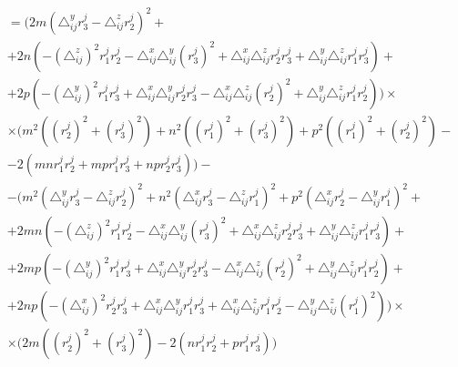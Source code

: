 $$\begin{gathered}
	 = \Bigg( 2 m \left( \triangle_{ij}^y r_3^j - \triangle_{ij}^z r_2^j \right)^2 + \\
	+ 2 n \left( - \left( \triangle_{ij}^z \right)^2 r_1^j r_2^j - \triangle_{ij}^x \triangle_{ij}^y (r_3^j)^2 + \triangle_{ij}^x  \triangle_{ij}^z r_2^j r_3^j + \triangle_{ij}^y  \triangle_{ij}^z r_1^j r_3^j \right) + \\
	+ 2 p \left( - \left( \triangle_{ij}^y\right)^2 r_1^j r_3^j +  \triangle_{ij}^x \triangle_{ij}^y r_2^j r_3^j -  \triangle_{ij}^x  \triangle_{ij}^z (r_2^j)^2 +  \triangle_{ij}^y  \triangle_{ij}^z r_1^j r_2^j \right)  \Bigg) \times \\
	\times \Bigg( m^2 \left((r_2^j)^2 + (r_3^j)^2\right) + n^2 \left((r_1^j)^2 + (r_3^j)^2\right) + p^2 \left((r_1^j)^2 + (r_2^j)^2\right) - \\
	- 2 (m n r_1^j r_2^j + m p r_1^j r_3^j + n p r_2^j r_3^j) \Bigg) - \\ %
	- \Bigg( m^2 \left( \triangle_{ij}^y r_3^j - \triangle_{ij}^z r_2^j \right)^2 
	+ n^2 \left( \triangle_{ij}^x r_3^j - \triangle_{ij}^z r_1^j \right)^2
	+ p^2 \left( \triangle_{ij}^x r_2^j - \triangle_{ij}^y r_1^j \right)^2 + \\
	+ 2 m n \left( - \left( \triangle_{ij}^z \right)^2 r_1^j r_2^j - \triangle_{ij}^x \triangle_{ij}^y (r_3^j)^2 + \triangle_{ij}^x  \triangle_{ij}^z r_2^j r_3^j + \triangle_{ij}^y  \triangle_{ij}^z r_1^j r_3^j \right) + \\
	+ 2 m p \left( - \left( \triangle_{ij}^y\right)^2 r_1^j r_3^j +  \triangle_{ij}^x \triangle_{ij}^y r_2^j r_3^j -  \triangle_{ij}^x  \triangle_{ij}^z (r_2^j)^2 +  \triangle_{ij}^y  \triangle_{ij}^z r_1^j r_2^j \right) + \\
	+ 2 n p \left( - \left(\triangle_{ij}^x\right)^2 r_2^j r_3^j +  \triangle_{ij}^x \triangle_{ij}^y r_1^j r_3^j +  \triangle_{ij}^x  \triangle_{ij}^z r_1^j r_2^j -  \triangle_{ij}^y  \triangle_{ij}^z (r_1^j)^2 \right) \Bigg) \times \\ %
	\times \bigg( 2 m \left((r_2^j)^2 + (r_3^j)^2\right) - 2 (n r_1^j r_2^j + p r_1^j r_3^j) \Bigg)
\end{gathered}$$

